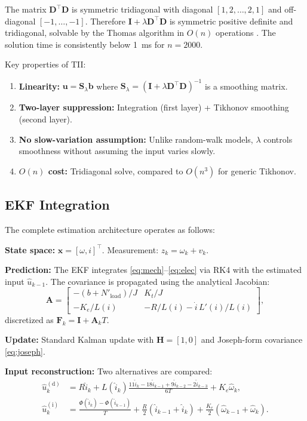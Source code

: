 \documentclass[lettersize,journal]{IEEEtran}
\begin{document}
The matrix $\mathbf{D}^\top\mathbf{D}$ is symmetric tridiagonal with diagonal $[1, 2, \ldots, 2, 1]$ and off-diagonal $[-1, \ldots, -1]$. Therefore $\mathbf{I} + \lambda\mathbf{D}^\top\mathbf{D}$ is symmetric positive definite and tridiagonal, solvable by the Thomas algorithm in $O(n)$ operations \cite{golub2013}. The solution time is consistently below 1~ms for $n = 2000$.

Key properties of TII:
\begin{enumerate}
    \item \textbf{Linearity:} $\mathbf{u} = \mathbf{S}_\lambda\mathbf{b}$ where $\mathbf{S}_\lambda = (\mathbf{I} + \lambda\mathbf{D}^\top\mathbf{D})^{-1}$ is a smoothing matrix.
    \item \textbf{Two-layer suppression:} Integration (first layer) + Tikhonov smoothing (second layer).
    \item \textbf{No slow-variation assumption:} Unlike random-walk models, $\lambda$ controls smoothness without assuming the input varies slowly.
    \item \textbf{$O(n)$ cost:} Tridiagonal solve, compared to $O(n^3)$ for generic Tikhonov.
\end{enumerate}

\subsection{EKF Integration}

The complete estimation architecture operates as follows:

\textbf{State space:} $\mathbf{x} = [\omega, i]^\top$. Measurement: $z_k = \omega_k + v_k$.

\textbf{Prediction:} The EKF integrates \eqref{eq:mech}--\eqref{eq:elec} via RK4 with the estimated input $\hat{u}_{k-1}$. The covariance is propagated using the analytical Jacobian:
\begin{equation}
\label{eq:jac_A}
\mathbf{A} = \begin{bmatrix}
-(b + N'_{\text{load}})/J & K_t/J \\[4pt]
-K_e/L(i) & -R/L(i) - \dot{i}\,L'(i)/L(i)
\end{bmatrix},
\end{equation}
discretized as $\mathbf{F}_k = \mathbf{I} + \mathbf{A}_k T$.

\textbf{Update:} Standard Kalman update with $\mathbf{H} = [1, 0]$ and Joseph-form covariance \eqref{eq:joseph}.

\textbf{Input reconstruction:} Two alternatives are compared:
\begin{align}
\hat{u}_k^{(\text{d})} &= R\hat{i}_k + L(\hat{i}_k)\frac{11\hat{i}_k - 18\hat{i}_{k-1} + 9\hat{i}_{k-2} - 2\hat{i}_{k-3}}{6T} + K_e\hat{\omega}_k, \label{eq:u_deriv}\\
\hat{u}_k^{(\text{i})} &= \frac{\Phi(\hat{i}_k) - \Phi(\hat{i}_{k-1})}{T} + \frac{R}{2}(\hat{i}_{k-1} + \hat{i}_k) + \frac{K_e}{2}(\hat{\omega}_{k-1} + \hat{\omega}_k). \label{eq:u_int_ekf}
\end{align}
\end{document}
